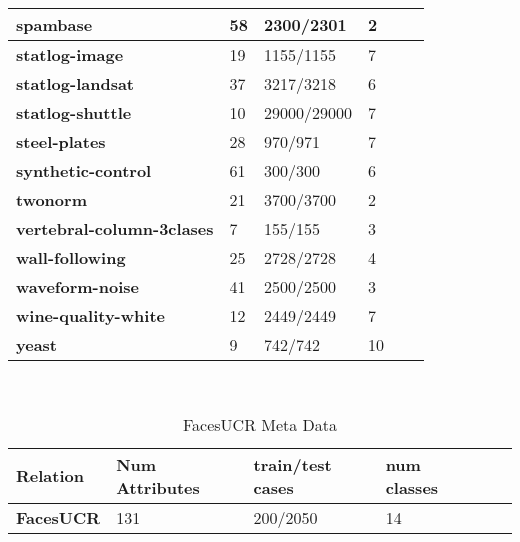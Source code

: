 \documentclass{cmppgr}
\begin{document}
\begin{table}[th]
\begin{tabular}{|p{2cm}|p{1.4cm}|p{1.4cm}| p{1.4cm} |p{1cm}| p{1cm}|}
  \hline \bf spambase & 58 & 2300/2301 & 2 \\ [7pt]
  \hline \bf statlog-image & 19 & 1155/1155 & 7 \\ [7pt]
  \hline \bf statlog-landsat & 37 & 3217/3218 & 6 \\ [7pt]
  \hline \bf statlog-shuttle & 10 & 29000/29000 & 7 \\ [7pt]
  \hline \bf steel-plates & 28 & 970/971 & 7 \\ [7pt]
  \hline \bf synthetic-control & 61 & 300/300 & 6 \\ [7pt]
  \hline \bf twonorm & 21 & 3700/3700 & 2 \\ [7pt]
  \hline \bf vertebral-column-3clases & 7 & 155/155 & 3 \\ [7pt]
  \hline \bf wall-following & 25 & 2728/2728 & 4 \\ [7pt]
  \hline \bf waveform-noise & 41 & 2500/2500 & 3 \\ [7pt]
  \hline \bf wine-quality-white & 12 & 2449/2449 & 7 \\ [7pt]
  \hline \bf yeast & 9 & 742/742 & 10 \\ [7pt]
  \hline
  \end{tabular} \\
\end{table}

\begin{table}[th]
  \centering
  \scriptsize
  \caption{FacesUCR Meta Data}
  \begin{tabular}{|p{2cm}|p{1.4cm}|p{1.4cm}| p{1.4cm} |p{1cm}| p{1cm}|}
  \hline \bf Relation & \bf Num Attributes & \bf train/test cases & \bf num classes \\ [10pt]

  \hline \bf FacesUCR & 131 & 200/2050 & 14 \\ [7pt]

  \end{tabular} \\
\end{table}
\end{document}
